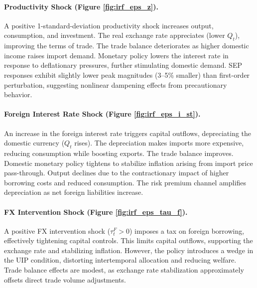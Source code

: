 \documentclass[12pt]{article}
\begin{document}
\paragraph{Productivity Shock (Figure \ref{fig:irf_eps_z}).}
A positive 1-standard-deviation productivity shock increases output, consumption, and investment. The real exchange rate appreciates (lower $Q_t$), improving the terms of trade. The trade balance deteriorates as higher domestic income raises import demand. Monetary policy lowers the interest rate in response to deflationary pressures, further stimulating domestic demand. SEP responses exhibit slightly lower peak magnitudes (3--5\% smaller) than first-order perturbation, suggesting nonlinear dampening effects from precautionary behavior.

\paragraph{Foreign Interest Rate Shock (Figure \ref{fig:irf_eps_i_st}).}
An increase in the foreign interest rate triggers capital outflows, depreciating the domestic currency ($Q_t$ rises). The depreciation makes imports more expensive, reducing consumption while boosting exports. The trade balance improves. Domestic monetary policy tightens to stabilize inflation arising from import price pass-through. Output declines due to the contractionary impact of higher borrowing costs and reduced consumption. The risk premium channel amplifies depreciation as net foreign liabilities increase.

\paragraph{FX Intervention Shock (Figure \ref{fig:irf_eps_tau_f}).}
A positive FX intervention shock ($\tau_t^F > 0$) imposes a tax on foreign borrowing, effectively tightening capital controls. This limits capital outflows, supporting the exchange rate and stabilizing inflation. However, the policy introduces a wedge in the UIP condition, distorting intertemporal allocation and reducing welfare. Trade balance effects are modest, as exchange rate stabilization approximately offsets direct trade volume adjustments.
\end{document}
